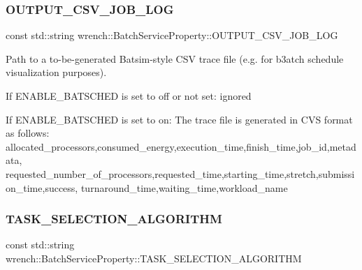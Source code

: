 \subsubsection{\texorpdfstring{O\+U\+T\+P\+U\+T\+\_\+\+C\+S\+V\+\_\+\+J\+O\+B\+\_\+\+L\+OG}{OUTPUT\_CSV\_JOB\_LOG}}
{\footnotesize\ttfamily const std\+::string wrench\+::\+Batch\+Service\+Property\+::\+O\+U\+T\+P\+U\+T\+\_\+\+C\+S\+V\+\_\+\+J\+O\+B\+\_\+\+L\+OG\hspace{0.3cm}{\ttfamily [static]}}



Path to a to-\/be-\/generated Batsim-\/style C\+SV trace file (e.\+g. for b3atch schedule visualization purposes). 


\begin{DoxyItemize}
\item If E\+N\+A\+B\+L\+E\+\_\+\+B\+A\+T\+S\+C\+H\+ED is set to off or not set\+: ignored
\item If E\+N\+A\+B\+L\+E\+\_\+\+B\+A\+T\+S\+C\+H\+ED is set to on\+: The trace file is generated in C\+VS format as follows\+: allocated\+\_\+processors,consumed\+\_\+energy,execution\+\_\+time,finish\+\_\+time,job\+\_\+id,metadata, requested\+\_\+number\+\_\+of\+\_\+processors,requested\+\_\+time,starting\+\_\+time,stretch,submission\+\_\+time,success, turnaround\+\_\+time,waiting\+\_\+time,workload\+\_\+name 
\end{DoxyItemize}\mbox{\label{classwrench_1_1_batch_service_property_a3869070a4dcfeea63bb5f9a8518de1cc}} 
\subsubsection{\texorpdfstring{T\+A\+S\+K\+\_\+\+S\+E\+L\+E\+C\+T\+I\+O\+N\+\_\+\+A\+L\+G\+O\+R\+I\+T\+HM}{TASK\_SELECTION\_ALGORITHM}}
{\footnotesize\ttfamily const std\+::string wrench\+::\+Batch\+Service\+Property\+::\+T\+A\+S\+K\+\_\+\+S\+E\+L\+E\+C\+T\+I\+O\+N\+\_\+\+A\+L\+G\+O\+R\+I\+T\+HM\hspace{0.3cm}{\ttfamily [static]}}



